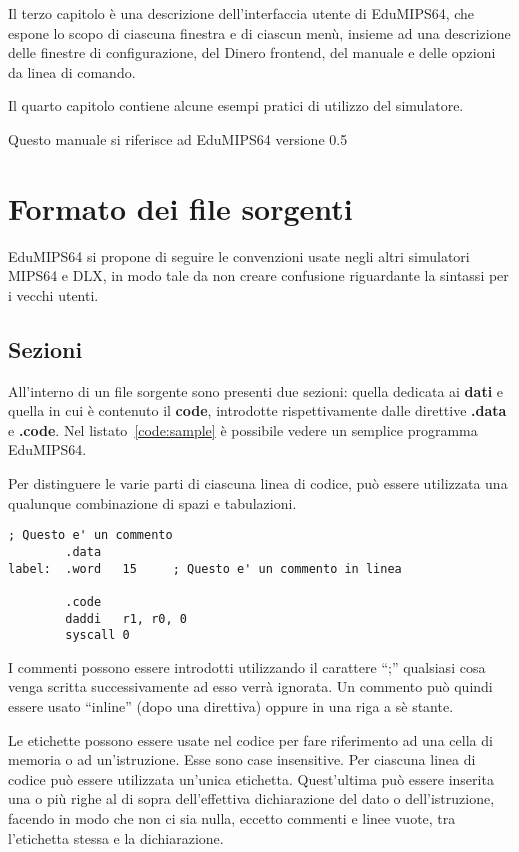\documentclass[12pt]{report}
\newcommand{\EM}{EduMIPS64}
\newcommand{\EV}{0.5}
\newcommand{\MS}{MIPS64}
\begin{document}
Il terzo capitolo \`{e} una descrizione dell'interfaccia utente di \EM{}, 
che espone lo scopo di ciascuna finestra e di ciascun men\`{u}, insieme ad una descrizione 
delle finestre di configurazione, del Dinero frontend, del manuale e delle opzioni da linea di comando. 

Il quarto capitolo contiene alcune esempi pratici di utilizzo del simulatore.

Questo manuale si riferisce ad EduMIPS64 versione \EV{}

\chapter{Formato dei file sorgenti}
\EM{} si propone di seguire le convenzioni usate negli altri simulatori \MS{} e DLX, 
in modo tale da non creare confusione riguardante la sintassi per i vecchi utenti.

\section{Sezioni}
All'interno di un file sorgente sono presenti due sezioni: quella dedicata ai \textbf{dati} 
e quella in cui \`{e} contenuto il \textbf{code}, introdotte rispettivamente dalle direttive \textbf{.data} e
\textbf{.code}. Nel listato~\ref{code:sample} \`{e} possibile vedere un semplice programma 
\EM{}.

Per distinguere le varie parti di ciascuna linea di codice, pu\`{o} essere utilizzata una qualunque combinazione di spazi e tabulazioni.

\begin{lstlisting}[caption={Esempio di codice \EM{}}, label={code:sample}, style={mips}]
; Questo e' un commento
        .data
label:  .word   15     ; Questo e' un commento in linea

        .code
        daddi   r1, r0, 0
        syscall 0
\end{lstlisting}

\index{;}
I commenti possono essere introdotti utilizzando il carattere ``;'' qualsiasi
cosa venga scritta successivamente ad esso verr\`{a} ignorata.  Un commento
pu\`{o} quindi essere usato ``inline'' (dopo una direttiva) oppure in una riga a
s\`{e} stante.

 Le etichette possono essere usate nel codice per fare
riferimento ad una cella di memoria o ad un'istruzione.  Esse sono case
insensitive. Per ciascuna linea di codice pu\`{o} essere utilizzata un'unica
etichetta. Quest'ultima pu\`{o} essere inserita una o pi\`{u} righe al di sopra
dell'effettiva dichiarazione del dato o dell'istruzione, facendo in modo che non
ci sia nulla, eccetto commenti e linee vuote, tra l'etichetta stessa e la
dichiarazione. 
\end{document}
